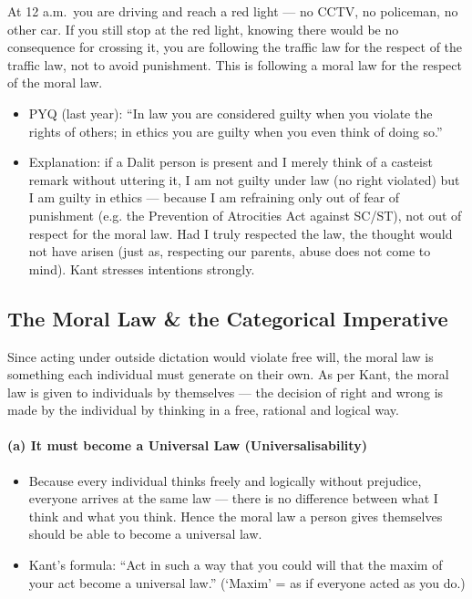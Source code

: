 \begin{ExampleBox}
At 12 a.m.\ you are driving and reach a red light --- no CCTV, no policeman, no other car. If you still stop at the red light, knowing there would be no consequence for crossing it, you are following the traffic law for the respect of the traffic law, not to avoid punishment. This is following a moral law for the respect of the moral law.
\end{ExampleBox}

\begin{PYQLink}
\begin{itemize}
\item PYQ (last year): ``In law you are considered guilty when you violate the rights of others; in ethics you are guilty when you even think of doing so.''
\item Explanation: if a Dalit person is present and I merely think of a casteist remark without uttering it, I am not guilty under law (no right violated) but I am guilty in ethics --- because I am refraining only out of fear of punishment (e.g. the Prevention of Atrocities Act against SC/ST), not out of respect for the moral law. Had I truly respected the law, the thought would not have arisen (just as, respecting our parents, abuse does not come to mind). Kant stresses intentions strongly.
\end{itemize}
\end{PYQLink}

\subsection{The Moral Law \& the Categorical Imperative}

\begin{KeyConcept}
Since acting under outside dictation would violate free will, the moral law is something each individual must generate on their own. As per Kant, the moral law is given to individuals by themselves --- the decision of right and wrong is made by the individual by thinking in a free, rational and logical way.
\end{KeyConcept}

\paragraph{(a) It must become a Universal Law (Universalisability)}
\begin{itemize}
\item Because every individual thinks freely and logically without prejudice, everyone arrives at the same law --- there is no difference between what I think and what you think. Hence the moral law a person gives themselves should be able to become a universal law.
\item Kant's formula: ``Act in such a way that you could will that the maxim of your act become a universal law.'' (`Maxim' = as if everyone acted as you do.)
\end{itemize}


